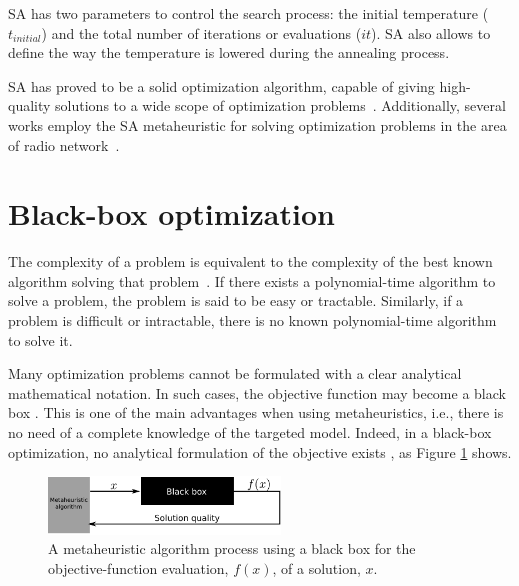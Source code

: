 SA has two parameters to control the search process: the initial temperature
($t_{initial}$) and the total number of iterations or evaluations
($it$). SA also allows to define the way the temperature is lowered
during the annealing process.

SA has proved to be a solid optimization algorithm, capable of giving
high-quality solutions to a wide scope of optimization problems~\cite{Suman_SurveyOfSimulatedAnnealing}.
Additionally, several works employ the SA metaheuristic for solving
optimization problems in the area of radio network~\cite{Benedicic_Balancing_downlink_uplink_soft_handover_areas_in_UMTS_networks:2012,Duque-Channel_assignment_for_cellular_radio_using_simulated_annealing:1993,CPICH.optimization:2003,minimum.set.covering.problem:2000,Coverage.optimization.on.CPICH.tilt.and.azimuth:2006,Zhang-Mathematical_modelling_and_comparisons_of_heuristics_for_WCDMA_radio_planning:2006}.


\section{Black-box optimization \label{sub:02-Black_box_optimization}}

The complexity of a problem is equivalent to the complexity of the
best known algorithm solving that problem~\cite{Talbi-Metaheuristics_from_design_to_implementation:2009}.
If there exists a polynomial-time algorithm to solve a problem, the
problem is said to be easy or tractable. Similarly, if a problem is
difficult or intractable, there is no known polynomial-time algorithm
to solve it. 

Many optimization problems cannot be formulated with a clear analytical
mathematical notation. In such cases, the objective function may become
a black box \cite{Kargupta-Search_blackbox_optimization_and_sample_complexity:1996}.
This is one of the main advantages when using metaheuristics, i.e.,
there is no need of a complete knowledge of the targeted model. Indeed,
in a black-box optimization, no analytical formulation of the objective
exists \cite{Talbi-Metaheuristics_from_design_to_implementation:2009},
as Figure \ref{fig:02-black_box_optimization} shows.

\begin{figure}
\centering

\includegraphics[width=0.55\textwidth]{02-background_and_motivation/img/blackbox_optimization}

\caption{A metaheuristic algorithm process using a black box for the objective-function
evaluation, $f(x)$, of a solution, $x$. \label{fig:02-black_box_optimization}}
\end{figure}


